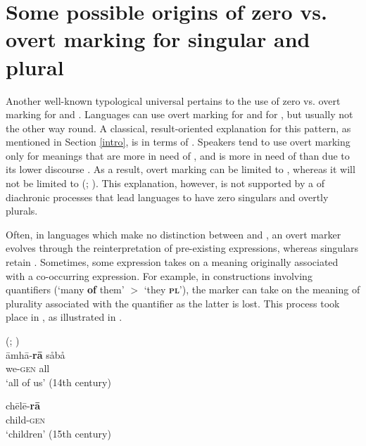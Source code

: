 \documentclass[output=paper]{langsci/langscibook}
\begin{document}
\section{Some possible origins of zero vs. overt marking for singular
  and plural}\label{number}
Another well-known typological
universal pertains to the use of zero vs. overt
marking for  and . Languages can use overt marking for  and  for
  , but usually not the other way round. A classical,
  result-oriented explanation for this pattern, as
  mentioned in Section \ref{intro},  is in terms of . Speakers tend to use overt marking
  only for meanings that are more in need of , and  is more in need of  than  due to its
  lower discourse . As a result, overt marking can be limited
  to , whereas it will not be limited to  (\citealt{Greenberg1966,TU2};
  \citealt{Haspelmath2008}).  This explanation, however, is not
supported by a  of diachronic processes that lead languages to
have zero  singulars and overtly  plurals.


Often, in languages which make no distinction between 
and , an overt  marker evolves through the reinterpretation of
pre-existing expressions, whereas
    singulars retain . Sometimes, some expression takes on a  meaning originally associated with
      a co-occurring expression. For example, in 
      constructions involving  quantifiers (`many
      {\bf of} them' $>$ `they  {\bf \textsc{pl}}'), the  marker can take on the meaning of
      plurality associated with the quantifier as the latter is
      lost. This process took place in  , as illustrated in .

\newpage

\ea\label{bengali}
 (; )\\
\ea
\gll āmhā-\textbf{{rā}} s{\r{a}}b{\r{a}}\\
we-\textsc{gen} all\\
\glt `all of us' (14th century)


\ex
\gll chēlē-\textbf{{rā}} \\
child-\textsc{gen}\\
\glt `children' (15th century)
\end{document}
